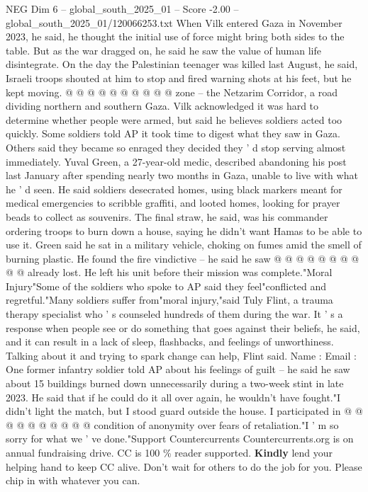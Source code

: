 \begin{textsample}{NEG Dim 6 – global\_south\_2025\_01 – Score -2.00 – global\_south\_2025\_01/120066253.txt}
When Vilk entered Gaza in November 2023, he said, he thought the initial use of force might bring both sides to the table.
But as the war dragged on, he said he saw the value of human life disintegrate.
On the day the Palestinian teenager was killed last August, he said, Israeli troops shouted at him to stop and fired warning shots at his feet, but he kept moving. @ @ @ @ @ @ @ @ @ @ zone -- the Netzarim Corridor, a road dividing northern and southern Gaza.
Vilk acknowledged it was hard to determine whether people were armed, but said he believes soldiers acted too quickly.
Some soldiers told AP it took time to digest what they saw in Gaza.
Others said they became so enraged they decided they ' d stop serving almost immediately.
Yuval Green, a 27-year-old medic, described abandoning his post last January after spending nearly two months in Gaza, unable to live with what he ' d seen.
He said soldiers desecrated homes, using black markers meant for medical emergencies to scribble graffiti, and looted homes, looking for prayer beads to collect as souvenirs.
The final straw, he said, was his commander ordering troops to burn down a house, saying he didn't want Hamas to be able to use it.
Green said he sat in a military vehicle, choking on fumes amid the smell of burning plastic.
He found the fire vindictive -- he said he saw @ @ @ @ @ @ @ @ @ @ already lost.
He left his unit before their mission was complete."Moral Injury"Some of the soldiers who spoke to AP said they feel"conflicted and regretful."Many soldiers suffer from"moral injury,"said Tuly Flint, a trauma therapy specialist who ' s counseled hundreds of them during the war.
It ' s a response when people see or do something that goes against their beliefs, he said, and it can result in a lack of sleep, flashbacks, and feelings of unworthiness.
Talking about it and trying to spark change can help, Flint said.
Name : Email : One former infantry soldier told AP about his feelings of guilt -- he said he saw about 15 buildings burned down unnecessarily during a two-week stint in late 2023.
He said that if he could do it all over again, he wouldn't have fought."I didn't light the match, but I stood guard outside the house.
I participated in @ @ @ @ @ @ @ @ @ @ condition of anonymity over fears of retaliation."I ' m so sorry for what we ' ve done."Support Countercurrents Countercurrents.org is on annual fundraising drive.
CC is 100 \% reader supported. \textbf{Kindly} lend your helping hand to keep CC alive.
Don't wait for others to do the job for you.
Please chip in with whatever you can.

\end{textsample}
